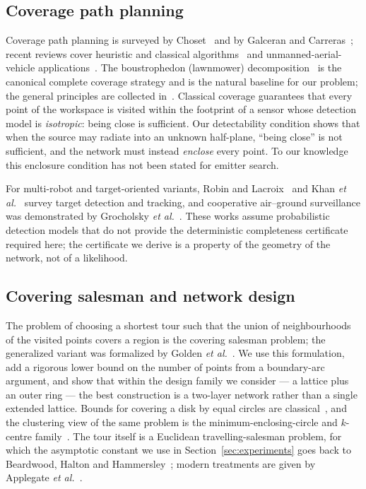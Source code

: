 \documentclass[preprint,12pt,3p]{elsarticle}
\theoremstyle{definition}
\begin{document}
\subsection{Coverage path planning}
Coverage path planning is surveyed by Choset~\cite{choset2001} and by Galceran and
Carreras~\cite{galceran2013}; recent reviews cover heuristic and classical
algorithms~\cite{tan2021} and unmanned-aerial-vehicle applications~\cite{cabreira2019}. The
boustrophedon (lawnmower) decomposition~\cite{choset1998} is the canonical complete coverage
strategy and is the natural baseline for our problem; the general principles are collected
in~\cite{choset2005}. Classical coverage guarantees that every point of the workspace is visited
within the footprint of a sensor whose detection model is \emph{isotropic}: being close is
sufficient. Our detectability condition shows that when the source may radiate into an unknown
half-plane, ``being close'' is not sufficient, and the network must instead \emph{enclose} every
point. To our knowledge this enclosure condition has not been stated for emitter search.

For multi-robot and target-oriented variants, Robin and Lacroix~\cite{robin2016} and Khan
\emph{et al.}~\cite{khan2018} survey target detection and tracking, and cooperative air--ground
surveillance was demonstrated by Grocholsky \emph{et al.}~\cite{grocholsky2006}. These works
assume probabilistic detection models that do not provide the deterministic completeness
certificate required here; the certificate we derive is a property of the geometry of the
network, not of a likelihood.

\subsection{Covering salesman and network design}
The problem of choosing a shortest tour such that the union of neighbourhoods of the visited
points covers a region is the covering salesman problem; the generalized variant was formalized by
Golden \emph{et al.}~\cite{golden2012}. We use this formulation, add a rigorous lower bound on the
number of points from a boundary-arc argument, and show that within the design family we consider --- a lattice plus an outer ring --- the best construction is a two-layer network rather than a single extended lattice. Bounds for covering a disk by equal circles are
classical~\cite{nica2011,jung1901,toth1998}, and the clustering view of the same problem is the
minimum-enclosing-circle and $k$-centre family~\cite{gonzalez1985,preparata1985}. The tour itself
is a Euclidean travelling-salesman problem, for which the asymptotic constant we use in
Section~\ref{sec:experiments} goes back to Beardwood, Halton and
Hammersley~\cite{beardwood1959}; modern treatments are given by
Applegate \emph{et al.}~\cite{applegate2006}.
\end{document}
